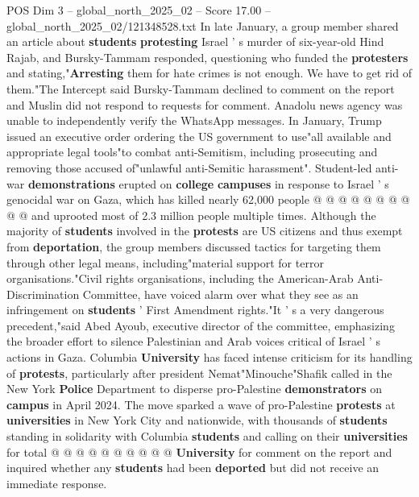 \begin{textsample}{POS Dim 3 – global\_north\_2025\_02 – Score 17.00 – global\_north\_2025\_02/121348528.txt}
In late January, a group member shared an article about \textbf{students} \textbf{protesting} Israel ' s murder of six-year-old Hind Rajab, and Bursky-Tammam responded, questioning who funded the \textbf{protesters} and stating,"\textbf{Arresting} them for hate crimes is not enough.
We have to get rid of them."The Intercept said Bursky-Tammam declined to comment on the report and Muslin did not respond to requests for comment.
Anadolu news agency was unable to independently verify the WhatsApp messages.
In January, Trump issued an executive order ordering the US government to use"all available and appropriate legal tools"to combat anti-Semitism, including prosecuting and removing those accused of"unlawful anti-Semitic harassment".
Student-led anti-war \textbf{demonstrations} erupted on \textbf{college} \textbf{campuses} in response to Israel ' s genocidal war on Gaza, which has killed nearly 62,000 people @ @ @ @ @ @ @ @ @ @ and uprooted most of 2.3 million people multiple times.
Although the majority of \textbf{students} involved in the \textbf{protests} are US citizens and thus exempt from \textbf{deportation}, the group members discussed tactics for targeting them through other legal means, including"material support for terror organisations."Civil rights organisations, including the American-Arab Anti-Discrimination Committee, have voiced alarm over what they see as an infringement on \textbf{students} ' First Amendment rights."It ' s a very dangerous precedent,"said Abed Ayoub, executive director of the committee, emphasizing the broader effort to silence Palestinian and Arab voices critical of Israel ' s actions in Gaza.
Columbia \textbf{University} has faced intense criticism for its handling of \textbf{protests}, particularly after president Nemat"Minouche"Shafik called in the New York \textbf{Police} Department to disperse pro-Palestine \textbf{demonstrators} on \textbf{campus} in April 2024.
The move sparked a wave of pro-Palestine \textbf{protests} at \textbf{universities} in New York City and nationwide, with thousands of \textbf{students} standing in solidarity with Columbia \textbf{students} and calling on their \textbf{universities} for total @ @ @ @ @ @ @ @ @ @ \textbf{University} for comment on the report and inquired whether any \textbf{students} had been \textbf{deported} but did not receive an immediate response.

\end{textsample}
